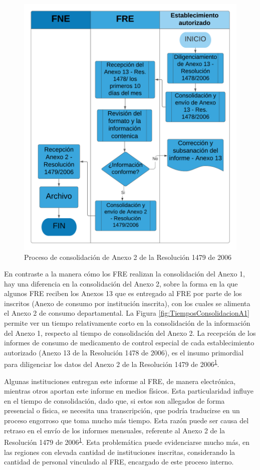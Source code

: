 \documentclass[
]{book}
\begin{document}
\begin{figure}

{\centering \includegraphics[width=0.8\linewidth]{figures/Consolidacion_A2_Res_1479_2006} 

}

\caption{Proceso de consolidación de Anexo 2 de la Resolución 1479 de 2006}\label{fig:procesoA2-1479}
\end{figure}

En contraste a la manera cómo los FRE realizan la consolidación del Anexo 1, hay una diferencia en la consolidación del Anexo 2, sobre la forma en la que algunos FRE reciben los Anexos 13 que es entregado al FRE por parte de los inscritos (Anexo de consumo por institución inscrita), con los cuales se alimenta el Anexo 2 de consumo departamental. La Figura \ref{fig:TiemposConsolidacionA1} permite ver un tiempo relativamente corto en la consolidación de la información del Anexo 1, respecto al tiempo de consolidación del Anexo 2. La recepción de los informes de consumo de medicamento de control especial de cada establecimiento autorizado (Anexo 13 de la Resolución 1478 de 2006), es el insumo primordial para diligenciar los datos del Anexo 2 de la Resolución 1479 de 2006\textsuperscript{\protect\hyperlink{ref-MSPS1479-2006}{1}}.

Algunas instituciones entregan este informe al FRE, de manera electrónica, mientras otros aportan este informe en medios físicos. Esta particularidad influye en el tiempo de consolidación, dado que, si estos son allegados de forma presencial o física, se necesita una transcripción, que podría traducirse en un proceso engorroso que toma mucho más tiempo. Esta razón puede ser causa del retraso en el envío de los informes mensuales, referente al Anexo 2 de la Resolución 1479 de 2006\textsuperscript{\protect\hyperlink{ref-MSPS1479-2006}{1}}. Esta problemática puede evidenciarse mucho más, en las regiones con elevada cantidad de instituciones inscritas, considerando la cantidad de personal vinculado al FRE, encargado de este proceso interno.
\end{document}
